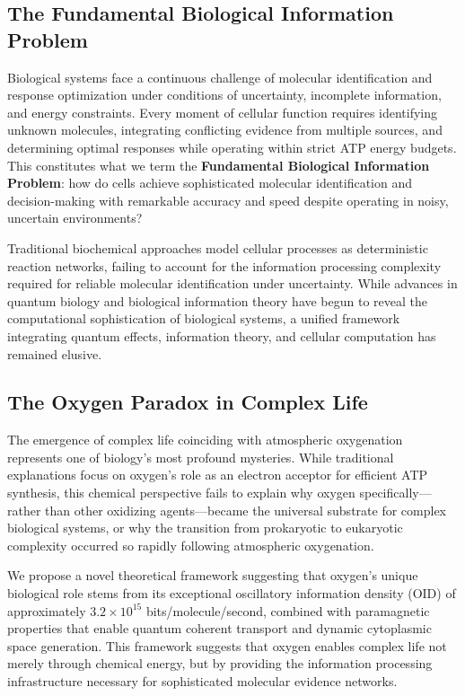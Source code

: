 \documentclass[12pt,a4paper]{article}
\begin{document}
\subsection{The Fundamental Biological Information Problem}

Biological systems face a continuous challenge of molecular identification and response optimization under conditions of uncertainty, incomplete information, and energy constraints. Every moment of cellular function requires identifying unknown molecules, integrating conflicting evidence from multiple sources, and determining optimal responses while operating within strict ATP energy budgets. This constitutes what we term the \textbf{Fundamental Biological Information Problem}: how do cells achieve sophisticated molecular identification and decision-making with remarkable accuracy and speed despite operating in noisy, uncertain environments?

Traditional biochemical approaches model cellular processes as deterministic reaction networks, failing to account for the information processing complexity required for reliable molecular identification under uncertainty. While advances in quantum biology \citep{lambert2013quantum} and biological information theory \citep{mizraji2021biological} have begun to reveal the computational sophistication of biological systems, a unified framework integrating quantum effects, information theory, and cellular computation has remained elusive.

\subsection{The Oxygen Paradox in Complex Life}

The emergence of complex life coinciding with atmospheric oxygenation represents one of biology's most profound mysteries. While traditional explanations focus on oxygen's role as an electron acceptor for efficient ATP synthesis, this chemical perspective fails to explain why oxygen specifically—rather than other oxidizing agents—became the universal substrate for complex biological systems, or why the transition from prokaryotic to eukaryotic complexity occurred so rapidly following atmospheric oxygenation.

We propose a novel theoretical framework suggesting that oxygen's unique biological role stems from its exceptional oscillatory information density (OID) of approximately $3.2 \times 10^{15}$ bits/molecule/second, combined with paramagnetic properties that enable quantum coherent transport and dynamic cytoplasmic space generation. This framework suggests that oxygen enables complex life not merely through chemical energy, but by providing the information processing infrastructure necessary for sophisticated molecular evidence networks.
\end{document}

